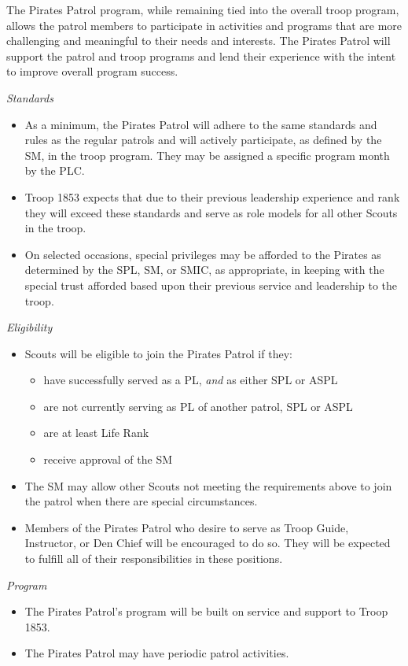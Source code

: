 \documentclass{ltxguide}
\begin{document}
The Pirates Patrol program, while remaining tied into the overall troop program, allows the patrol members to participate in activities and programs that are more challenging and meaningful to their needs and interests. The Pirates Patrol will support the patrol and troop programs and lend their experience with the intent to improve overall program success.

\textit{Standards}
\begin{itemize}
	\item As a minimum, the Pirates Patrol will adhere to the same standards and rules as the regular patrols and will actively participate, as defined by the SM, in the troop program. They may be assigned a specific program month by the \ac{PLC}.
	\item Troop 1853 expects that due to their previous leadership experience and rank they will exceed these standards and serve as role models for all other Scouts in the troop.
	\item On selected occasions, special privileges may be afforded to the Pirates as determined by the \ac{SPL}, \ac{SM}, or \ac{SMIC}, as appropriate, in keeping with the special trust afforded based upon their previous service and leadership to the troop.
\end{itemize}

\textit{Eligibility}
\begin{itemize}
	\item Scouts will be eligible to join the Pirates Patrol if they:
	\begin{itemize}
		\item have successfully served as a \ac{PL}, \textit{and} as either \ac{SPL} or \ac{ASPL}
		\item are not currently serving as PL of another patrol, \ac{SPL} or \ac{ASPL}
		\item are at least Life Rank
		\item receive approval of the \ac{SM}
	\end{itemize}
	\item The \ac{SM} may allow other Scouts not meeting the requirements above to join the patrol when there are special circumstances.
	\item Members of the Pirates Patrol who desire to serve as Troop Guide, Instructor, or Den Chief will be encouraged to do so. They will be expected to fulfill all of their responsibilities in these positions.
\end{itemize}

\textit{Program}
\begin{itemize}
	\item The Pirates Patrol's program will be built on service and support to Troop 1853.
	\item The Pirates Patrol may have periodic patrol activities.
\end{itemize}
\end{document}
